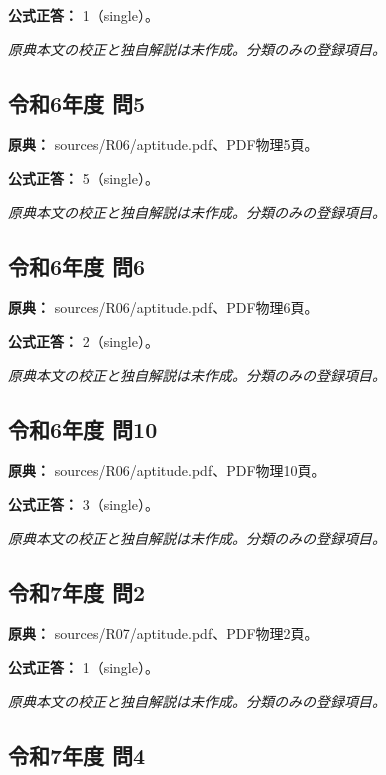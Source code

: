 \textbf{公式正答：} 1（single）。

\par\textit{原典本文の校正と独自解説は未作成。分類のみの登録項目。}

\subsection{令和6年度 問5}
\label{q:r06-reg-apt-05}

\noindent\textbf{原典：} sources/R06/aptitude.pdf、PDF物理5頁。

\textbf{公式正答：} 5（single）。

\par\textit{原典本文の校正と独自解説は未作成。分類のみの登録項目。}

\subsection{令和6年度 問6}
\label{q:r06-reg-apt-06}

\noindent\textbf{原典：} sources/R06/aptitude.pdf、PDF物理6頁。

\textbf{公式正答：} 2（single）。

\par\textit{原典本文の校正と独自解説は未作成。分類のみの登録項目。}

\subsection{令和6年度 問10}
\label{q:r06-reg-apt-10}

\noindent\textbf{原典：} sources/R06/aptitude.pdf、PDF物理10頁。

\textbf{公式正答：} 3（single）。

\par\textit{原典本文の校正と独自解説は未作成。分類のみの登録項目。}

\subsection{令和7年度 問2}
\label{q:r07-reg-apt-02}

\noindent\textbf{原典：} sources/R07/aptitude.pdf、PDF物理2頁。

\textbf{公式正答：} 1（single）。

\par\textit{原典本文の校正と独自解説は未作成。分類のみの登録項目。}

\subsection{令和7年度 問4}
\label{q:r07-reg-apt-04}

